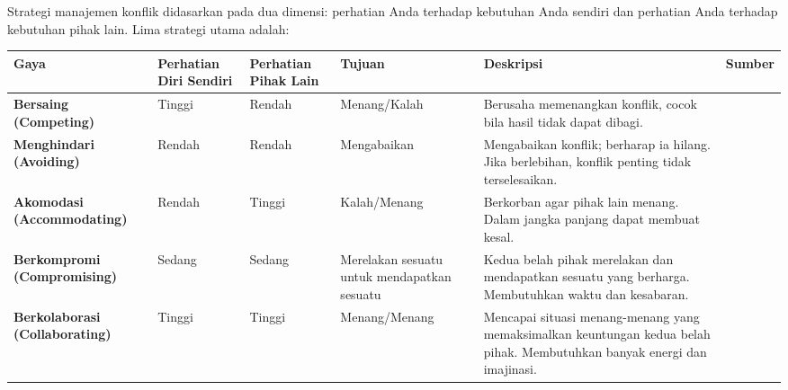 \documentclass[
  letterpaper,
  DIV=11,
  numbers=noendperiod]{scrreprt}
\begin{document}
Strategi manajemen konflik didasarkan pada dua dimensi: perhatian Anda
terhadap kebutuhan Anda sendiri dan perhatian Anda terhadap kebutuhan
pihak lain. Lima strategi utama adalah:

\begin{longtable}[]{@{}
  >{\raggedright\arraybackslash}p{}
  >{\raggedright\arraybackslash}p{}
  >{\raggedright\arraybackslash}p{}
  >{\raggedright\arraybackslash}p{}
  >{\raggedright\arraybackslash}p{}
  >{\raggedright\arraybackslash}p{}@{}}
\toprule\noalign{}
\begin{minipage}[b]{\linewidth}\raggedright
Gaya
\end{minipage} & \begin{minipage}[b]{\linewidth}\raggedright
Perhatian Diri Sendiri
\end{minipage} & \begin{minipage}[b]{\linewidth}\raggedright
Perhatian Pihak Lain
\end{minipage} & \begin{minipage}[b]{\linewidth}\raggedright
Tujuan
\end{minipage} & \begin{minipage}[b]{\linewidth}\raggedright
Deskripsi
\end{minipage} & \begin{minipage}[b]{\linewidth}\raggedright
Sumber
\end{minipage} \\
\midrule\noalign{}
\endhead
\bottomrule\noalign{}
\endlastfoot
\textbf{Bersaing (Competing)} & Tinggi & Rendah & Menang/Kalah &
Berusaha memenangkan konflik, cocok bila hasil tidak dapat dibagi. & \\
\textbf{Menghindari (Avoiding)} & Rendah & Rendah & Mengabaikan &
Mengabaikan konflik; berharap ia hilang. Jika berlebihan, konflik
penting tidak terselesaikan. & \\
\textbf{Akomodasi (Accommodating)} & Rendah & Tinggi & Kalah/Menang &
Berkorban agar pihak lain menang. Dalam jangka panjang dapat membuat
kesal. & \\
\textbf{Berkompromi (Compromising)} & Sedang & Sedang & Merelakan
sesuatu untuk mendapatkan sesuatu & Kedua belah pihak merelakan dan
mendapatkan sesuatu yang berharga. Membutuhkan waktu dan kesabaran. & \\
\textbf{Berkolaborasi (Collaborating)} & Tinggi & Tinggi & Menang/Menang
& Mencapai situasi menang-menang yang memaksimalkan keuntungan kedua
belah pihak. Membutuhkan banyak energi dan imajinasi. & \\
\end{longtable}
\end{document}
